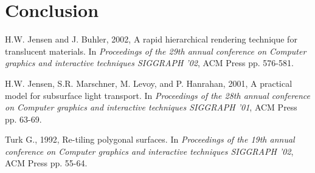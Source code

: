 \documentclass{article}
\begin{document}
\section{Conclusion}

\begin{thebibliography}{99}

 H.W. Jensen and J. Buhler, 2002, A rapid hierarchical rendering technique for translucent materials. In {\it Proceedings of the 29th annual conference on Computer graphics and interactive techniques SIGGRAPH '02}, ACM Press pp. 576-581.

 H.W. Jensen, S.R. Marschner, M. Levoy, and P. Hanrahan, 2001, A practical model for subsurface light transport. In {\it Proceedings of the 28th annual conference on Computer graphics and interactive techniques SIGGRAPH '01}, ACM Press pp. 63-69.

 Turk G., 1992, Re-tiling polygonal surfaces. In {\it Proceedings of the 19th annual conference on Computer graphics and interactive techniques SIGGRAPH '02}, ACM Press pp. 55-64.

\end{thebibliography}
\end{document}
